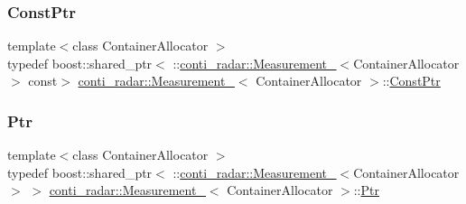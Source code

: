 \mbox{\label{structconti__radar_1_1Measurement___af533b3149ee9f88e772d0080e08b0e43}} 
\subsubsection{\texorpdfstring{Const\+Ptr}{ConstPtr}}
{\footnotesize\ttfamily template$<$class Container\+Allocator $>$ \\
typedef boost\+::shared\+\_\+ptr$<$ \+::\hyperlink{structconti__radar_1_1Measurement__}{conti\+\_\+radar\+::\+Measurement\+\_\+}$<$Container\+Allocator$>$ const$>$ \hyperlink{structconti__radar_1_1Measurement__}{conti\+\_\+radar\+::\+Measurement\+\_\+}$<$ Container\+Allocator $>$\+::\hyperlink{structconti__radar_1_1Measurement___af533b3149ee9f88e772d0080e08b0e43}{Const\+Ptr}}

\mbox{\label{structconti__radar_1_1Measurement___a581770a0ca6b1d82734898d07fd5cc6f}} 
\subsubsection{\texorpdfstring{Ptr}{Ptr}}
{\footnotesize\ttfamily template$<$class Container\+Allocator $>$ \\
typedef boost\+::shared\+\_\+ptr$<$ \+::\hyperlink{structconti__radar_1_1Measurement__}{conti\+\_\+radar\+::\+Measurement\+\_\+}$<$Container\+Allocator$>$ $>$ \hyperlink{structconti__radar_1_1Measurement__}{conti\+\_\+radar\+::\+Measurement\+\_\+}$<$ Container\+Allocator $>$\+::\hyperlink{structconti__radar_1_1Measurement___a581770a0ca6b1d82734898d07fd5cc6f}{Ptr}}

\mbox{\label{structconti__radar_1_1Measurement___a2200a2a7e732e715ac1630d6a4dccdab}} 
